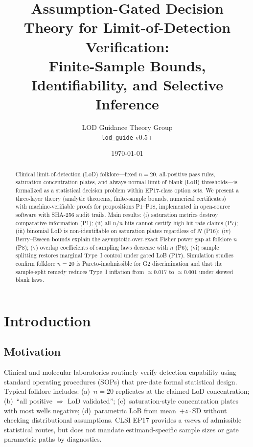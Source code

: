 \documentclass[11pt,a4paper]{article}
\title{Assumption-Gated Decision Theory for Limit-of-Detection Verification:\\
Finite-Sample Bounds, Identifiability, and Selective Inference}
\author{LOD Guidance Theory Group\\ \texttt{lod\_guide} v0.5+}
\date{\today}
\theoremstyle{definition}
\begin{document}
\maketitle

\begin{abstract}
Clinical limit-of-detection (LoD) folklore---fixed $n=20$, all-positive pass rules,
saturation concentration plates, and always-normal limit-of-blank (LoB) thresholds---is
formalized as a statistical decision problem within EP17-class option sets.
We present a three-layer theory (analytic theorems, finite-sample bounds, numerical
certificates) with machine-verifiable proofs for propositions P1--P18, implemented in
open-source software with SHA-256 audit trails.
Main results: (i) saturation metrics destroy comparative information (P1);
(ii) all-$n/n$ hits cannot certify high hit-rate claims (P7);
(iii) binomial LoD is non-identifiable on saturation plates regardless of $N$ (P16);
(iv) Berry--Esseen bounds explain the asymptotic-over-exact Fisher power gap at folklore $n$ (P8);
(v) overlap coefficients of sampling laws decrease with $n$ (P6);
(vi) sample splitting restores marginal Type~I control under gated LoB (P17).
Simulation studies confirm folklore $n=20$ is Pareto-inadmissible for G2 discrimination
and that the sample-split remedy reduces Type~I inflation from $\approx 0.017$ to $\approx 0.001$
under skewed blank laws.
\end{abstract}

\section{Introduction}

\subsection{Motivation}

Clinical and molecular laboratories routinely verify detection capability using
standard operating procedures (SOPs) that pre-date formal statistical design.
Typical folklore includes: (a)~$n=20$ replicates at the claimed LoD concentration;
(b)~``all positive $\Rightarrow$ LoD validated''; (c)~saturation-style concentration
plates with most wells negative; (d)~parametric LoB from mean~$+ z \cdot \text{SD}$
without checking distributional assumptions.
CLSI EP17 provides a \emph{menu} of admissible statistical routes, but does not
mandate estimand-specific sample sizes or gate parametric paths by diagnostics.
\end{document}
